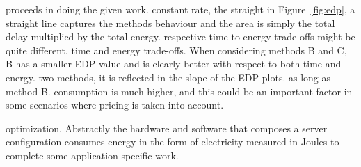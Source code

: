 proceeds in doing the given work.
constant rate, the straight
in Figure~\ref{fig:edp}, a straight line captures the methods behaviour and the
area is simply the total delay multiplied by the total energy.
respective time-to-energy trade-offs might be quite different.
time and energy trade-offs. When considering methods B and C, B has a smaller
EDP value and is clearly better with respect to both time and energy.
two methods, it is reflected in the slope of the EDP plots.
as long as method B.
consumption is much higher, and this could be an important factor in some
scenarios where pricing is taken into account.
%


optimization.   Abstractly the hardware and software that composes a server
configuration consumes energy in the form of electricity measured in Joules to
complete some application specific work.

